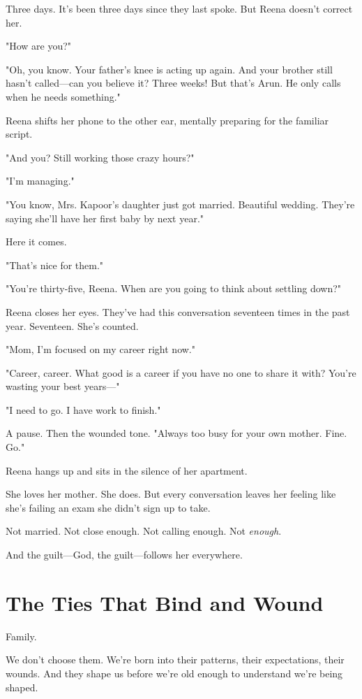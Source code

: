 \documentclass[11pt,twoside]{book}
\begin{document}
Three days. It's been three days since they last spoke. But Reena doesn't correct her.

"How are you?"

"Oh, you know. Your father's knee is acting up again. And your brother still hasn't called—can you believe it? Three weeks! But that's Arun. He only calls when he needs something."

Reena shifts her phone to the other ear, mentally preparing for the familiar script.

"And you? Still working those crazy hours?"

"I'm managing."

"You know, Mrs. Kapoor's daughter just got married. Beautiful wedding. They're saying she'll have her first baby by next year."

Here it comes.

"That's nice for them."

"You're thirty-five, Reena. When are you going to think about settling down?"

Reena closes her eyes. They've had this conversation seventeen times in the past year. Seventeen. She's counted.

"Mom, I'm focused on my career right now."

"Career, career. What good is a career if you have no one to share it with? You're wasting your best years—"

"I need to go. I have work to finish."

A pause. Then the wounded tone. "Always too busy for your own mother. Fine. Go."

Reena hangs up and sits in the silence of her apartment.

She loves her mother. She does. But every conversation leaves her feeling like she's failing an exam she didn't sign up to take.

Not married. Not close enough. Not calling enough. Not \emph{enough}.

And the guilt—God, the guilt—follows her everywhere.

\section*{The Ties That Bind and Wound}

Family.

We don't choose them. We're born into their patterns, their expectations, their wounds. And they shape us before we're old enough to understand we're being shaped.
\end{document}
